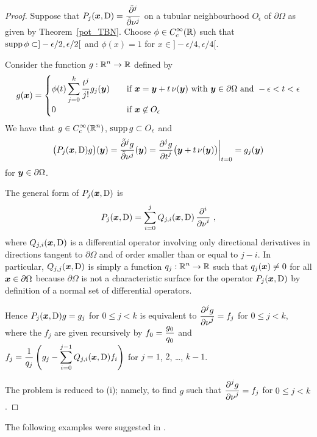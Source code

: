 \begin{proof}
 Suppose that
$\displaystyle P_j({\bm{x}},\operatorname{D}) = \frac{\tilde{\partial}^{j}{}}{\tilde{\partial}{\nu}^{j}}$ on a
tubular neighbourhood $O_\epsilon$ of $\partial \Omega$ as given
by Theorem~\ref{pot_TBN}.  Choose
$\displaystyle \phi\in C^\infty_c(\mathbb{R})$ such that
$\displaystyle \operatorname{supp} \phi \subset ]-\epsilon/2, \epsilon/2[$ and
$\phi(x) = 1$ for $x\in]-\epsilon/4, \epsilon/4[$.

Consider the function $\displaystyle g:\mathbb{R}^n \rightarrow \mathbb{R}$ defined by
\[
g({\bm{x}}) =
\begin{cases}
\displaystyle \phi(t) \sum_{j=0}^k \frac{t^j}{j!} g_j({\bm{y}}) &\quad
\text{if} \ {\bm{x}} = {\bm{y}} + t\, \nu({\bm{y}}) \
\text{with} \ {\bm{y}} \in \partial \Omega \ \text{and} \
-\epsilon < t < \epsilon \\[0.7em]
0 & \quad \text{if} \ {\bm{x}} \not\in O_\epsilon
\end{cases}
\]
We have that $\displaystyle g\in C^\infty_c(\mathbb{R}^n)$,
$\displaystyle \operatorname{supp} g \subset O_\epsilon$ and
\[
\big( P_j({\bm{x}},\operatorname{D})g\big)({\bm{y}}) = \frac{\tilde{\partial}^{j}{g}}{\tilde{\partial}{\nu}^{j}}({\bm{y}})
= \frac{\displaystyle \partial^{j}{g}} {\displaystyle \partial t^{j}}\big({\bm{y}}+t\, \nu({\bm{y}})\big)\bigg|_{t=0}
= g_j({\bm{y}})
\]
for ${\bm{y}} \in \partial \Omega$.

 The general form of $P_j({\bm{x}},\operatorname{D})$ is
\[
P_j({\bm{x}},\operatorname{D}) = \sum_{i=0}^j Q_{j,i}({\bm{x}},\operatorname{D})\,
\frac{\displaystyle \partial^{i}{}} {\displaystyle \partial \nu^{i}} \  ,
\]
where $Q_{j,i}({\bm{x}},\operatorname{D})$ is a differential operator involving only
directional derivatives in directions tangent to $\partial \Omega$ and
of order smaller than or equal to $j-i$.  In particular,
$Q_{j,j}({\bm{x}},\operatorname{D})$ is simply a function
$\displaystyle q_j:\mathbb{R}^n\rightarrow \mathbb{R}$
such that $q_j({\bm{x}}) \neq 0$ for all ${\bm{x}} \in \partial \Omega$
because $\partial \Omega$ is not a characteristic surface for the
operator $P_j({\bm{x}},\operatorname{D})$ by definition of a normal set of differential
operators.

Hence $P_j({\bm{x}},\operatorname{D})g=g_j$ for $0\leq j < k$ is equivalent to
$\displaystyle \frac{\displaystyle \partial^{j}{g}} {\displaystyle \partial \nu^{j}} = f_j$ for $0\leq j < k$, where
the $f_j$ are given recursively by $\displaystyle f_0 = \frac{g_0}{q_0}$
and
$\displaystyle f_j = \frac{1}{q_j} \left( g_j - \sum_{i=0}^{j-1}
Q_{j,i}({\bm{x}},\operatorname{D}) f_i \right)$
for $j=1$, $2$, \ldots, $k-1$.

The problem is reduced to (i); namely, to find $g$ such
that $\displaystyle \frac{\displaystyle \partial^{j}{g}} {\displaystyle \partial \nu^{j}} = f_j$ for $0\leq j < k$.
\end{proof}

The following examples were suggested in \cite{FoPDE}.

